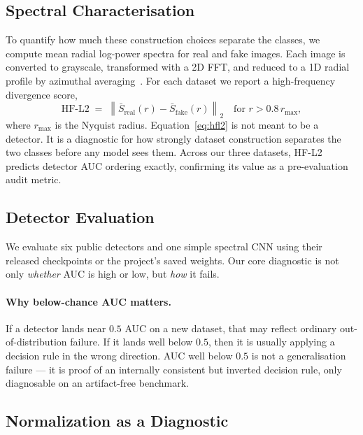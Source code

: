\documentclass{bmvc2k}
\begin{document}
\subsection{Spectral Characterisation}
\label{sec:spectral_method}

To quantify how much these construction choices separate the classes, we compute mean radial log-power spectra for real and fake images. Each image is converted to grayscale, transformed with a 2D FFT, and reduced to a 1D radial profile by azimuthal averaging~\cite{durall2020watch}. For each dataset we report a high-frequency divergence score,
\begin{equation}
\mathrm{HF\text{-}L2} \;=\; \left\lVert \bar{S}_{\mathrm{real}}(r) - \bar{S}_{\mathrm{fake}}(r) \right\rVert_2 \quad \text{for } r > 0.8\,r_{\max},
\label{eq:hfl2}
\end{equation}
where $r_{\max}$ is the Nyquist radius. Equation~\eqref{eq:hfl2} is not meant to be a detector. It is a diagnostic for how strongly dataset construction separates the two classes before any model sees them. Across our three datasets, HF-L2 predicts detector AUC ordering exactly, confirming its value as a pre-evaluation audit metric.

\subsection{Detector Evaluation}
\label{sec:eval_method}

We evaluate six public detectors and one simple spectral CNN using their released checkpoints or the project's saved weights. Our core diagnostic is not only \emph{whether} AUC is high or low, but \emph{how} it fails.

\paragraph{Why below-chance AUC matters.}
If a detector lands near $0.5$ AUC on a new dataset, that may reflect ordinary out-of-distribution failure. If it lands well below $0.5$, then it is usually applying a decision rule in the wrong direction. AUC well below $0.5$ is not a generalisation failure --- it is proof of an internally consistent but inverted decision rule, only diagnosable on an artifact-free benchmark.

\subsection{Normalization as a Diagnostic}
\label{sec:normalize}
\end{document}

